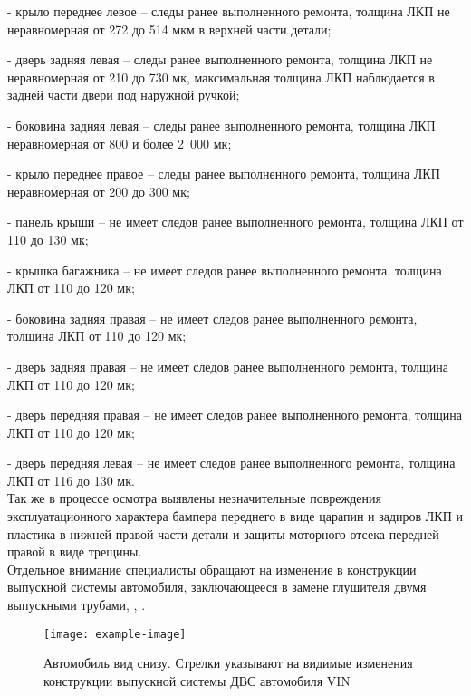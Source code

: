 - крыло переднее левое – следы ранее выполненного ремонта, толщина ЛКП не неравномерная от 272 до 514 мкм в верхней части детали;

- дверь задняя левая – следы ранее выполненного ремонта, толщина ЛКП не неравномерная от 210 до 730 мк, максимальная толщина ЛКП наблюдается в задней части двери под наружной ручкой;

- боковина задняя левая – следы ранее выполненного ремонта, толщина ЛКП  неравномерная от 800  и более 2 000 мк;

- крыло переднее правое – следы ранее выполненного ремонта, толщина ЛКП неравномерная от 200 до 300 мк;

- панель крыши – не имеет следов ранее выполненного ремонта, толщина ЛКП от 110 до 130 мк;

- крышка багажника – не имеет следов ранее выполненного ремонта, толщина ЛКП от 110 до 120 мк;

- боковина задняя правая – не имеет следов ранее выполненного ремонта, толщина ЛКП от 110 до 120 мк;

- дверь задняя правая – не имеет следов ранее выполненного ремонта, толщина ЛКП от 110 до 120 мк;

- дверь передняя правая – не имеет следов ранее выполненного ремонта, толщина ЛКП от 110 до 120 мк;

- дверь передняя левая – не имеет следов ранее выполненного ремонта, толщина ЛКП от 116 до 130 мк.\\

Так же в процессе осмотра выявлены незначительные повреждения эксплуатационного характера бампера переднего в виде царапин и задиров  ЛКП и пластика в нижней правой части детали и защиты моторного отсека передней правой в виде трещины.\\

Отдельное внимание специалисты обращают на изменение в конструкции выпускной системы автомобиля, заключающееся в замене  глушителя двумя выпускными трубами, , .\\


   \begin{figure}[H]
   	\centering
   	\texttt{[image: example-image]}
    \label{constr}
   	\caption{Автомобиль вид снизу. Стрелки указывают на видимые изменения конструкции выпускной системы ДВС автомобиля  VIN \vin}
     \end{figure}
   
